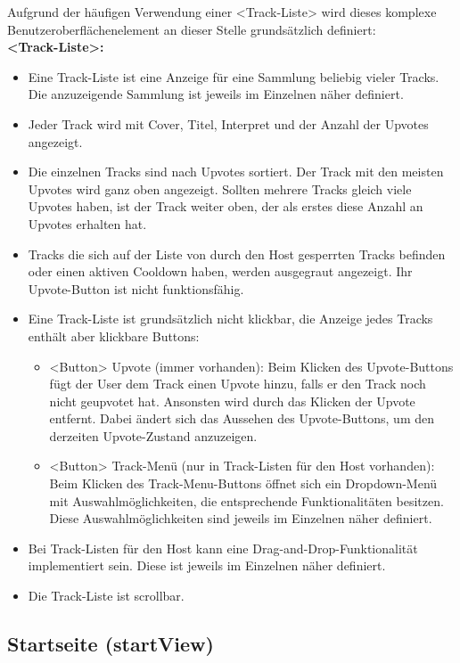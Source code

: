 \documentclass[oneside, ngerman]{sdqtechreport}
\begin{document}
Aufgrund der häufigen Verwendung einer <Track-Liste> wird dieses komplexe Benutzeroberflächenelement an dieser Stelle grundsätzlich definiert:
\vspace{\baselineskip} \\
\textbf{<Track-Liste>:}
\begin{itemize}
    \item Eine Track-Liste ist eine Anzeige für eine Sammlung beliebig vieler Tracks. Die anzuzeigende Sammlung ist jeweils im Einzelnen näher definiert.
    \item Jeder Track wird mit Cover, Titel, Interpret und der Anzahl der Upvotes angezeigt.
    \item Die einzelnen Tracks sind nach Upvotes sortiert. Der Track mit den meisten Upvotes wird ganz oben angezeigt. Sollten mehrere Tracks gleich viele Upvotes haben, ist der Track weiter oben, der als erstes diese Anzahl an Upvotes erhalten hat.
    \item Tracks die sich auf der Liste von durch den Host gesperrten Tracks befinden oder einen aktiven Cooldown haben, werden ausgegraut angezeigt. Ihr Upvote-Button ist nicht funktionsfähig.
    \item Eine Track-Liste ist grundsätzlich nicht klickbar, die Anzeige jedes Tracks enthält aber klickbare Buttons:
    \begin{itemize}
        \item <Button> Upvote (immer vorhanden): Beim Klicken des Upvote-Buttons fügt der User dem Track einen Upvote hinzu, falls er den Track noch nicht geupvotet hat. Ansonsten wird durch das Klicken der Upvote entfernt. Dabei ändert sich das Aussehen des Upvote-Buttons, um den derzeiten Upvote-Zustand anzuzeigen.
        \item <Button> Track-Menü (nur in Track-Listen für den Host vorhanden): Beim Klicken des Track-Menu-Buttons öffnet sich ein Dropdown-Menü mit Auswahlmöglichkeiten, die entsprechende Funktionalitäten besitzen. Diese Auswahlmöglichkeiten sind jeweils im Einzelnen näher definiert.
    \end{itemize}
    \item Bei Track-Listen für den Host kann eine Drag-and-Drop-Funktionalität implementiert sein. Diese ist jeweils im Einzelnen näher definiert.
    \item Die Track-Liste ist scrollbar.
\end{itemize}


\subsection{Startseite (startView)}
\label{sec:Benutzeroberfläche:startView}
\end{document}
